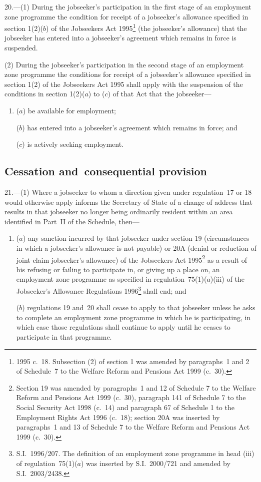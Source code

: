 \documentclass[12pt,a4paper]{article}
\begin{document}
20.---(1)  During the jobseeker’s participation in the first stage of an employment zone programme the condition for receipt of a jobseeker’s allowance specified in section 1(2)($b$)  of the Jobseekers Act 1995\footnote{1995 c.~18. Subsection (2) of section 1 was amended by paragraphs~1 and 2 of Schedule~7 to the Welfare Reform and Pensions Act 1999 (c.~30).} (the jobseeker’s allowance) that the jobseeker has entered into a jobseeker’s agreement which remains in force is suspended.

(2) During the jobseeker’s participation in the second stage of an employment zone programme the conditions for receipt of a jobseeker’s allowance specified in section 1(2) of the Jobseekers Act 1995 shall apply with the suspension of the conditions in section 1(2)($a$)  to ($c$)  of that Act that the jobseeker—
\begin{enumerate}\item[]
($a$) be available for employment;

($b$) has entered into a jobseeker’s agreement which remains in force; and

($c$) is actively seeking employment.
\end{enumerate}

\subsection[21. Cessation and~consequential provision]{Cessation and~consequential provision}

21.---(1)  Where a jobseeker to whom a direction given under regulation~17 or 18 would otherwise apply informs the Secretary of State of a change of address that results in that jobseeker no longer being ordinarily resident within an area identified in Part~II of the Schedule, then—
\begin{enumerate}\item[]
($a$) any sanction incurred by that jobseeker under section 19 (circumstances in which a jobseeker’s allowance is not payable) or 20A (denial or reduction of joint-claim jobseeker’s allowance) of the Jobseekers Act 1995\footnote{Section 19 was amended by paragraphs~1 and 12 of Schedule 7 to the Welfare Reform and Pensions Act 1999 (c.~30), paragraph 141 of Schedule 7 to the Social Security Act 1998 (c.~14) and paragraph 67 of Schedule 1 to the Employment Rights Act 1996 (c.~18); section 20A was inserted by paragraphs~1 and 13 of Schedule 7 to the Welfare Reform and Pensions Act 1999 (c.~30).} as a result of his refusing or failing to participate in, or giving up a place on, an employment zone programme as specified in regulation~75(1)($a$)(iii)  of the Jobseeker’s Allowance Regulations 1996\footnote{S.I.~1996/207. The definition of an employment zone programme in head (iii) of regulation~75(1)($a$) was inserted by S.I.~2000/721 and amended by S.I.~2003/2438.} shall end; and

($b$) regulations 19 and~20 shall cease to apply to that jobseeker unless he asks to complete an employment zone programme in which he is participating, in which case those regulations shall continue to apply until he ceases to participate in that programme.
\end{enumerate}
\end{document}
